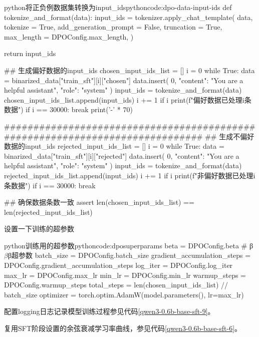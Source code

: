 \documentclass[lang=cn,newtx,10pt,scheme=chinese]{elegantbook}
\begin{document}
\begin{codebox}{python}{将正负例数据集转换为input\_ids}{pythoncode:dpo-data-input-ids}
def tokenize_and_format(data):
    input_ids = tokenizer.apply_chat_template(
        data,
        tokenize = True,
        add_generation_prompt = False,
        truncation = True,
        max_length = DPOConfig.max_length,
    )

    return input_ids

## 生成偏好数据的input_ids
chosen_input_ids_list = []
i = 0
while True:
    data = binarized_data["train_sft"][i]["chosen"]
    data.insert(
        0,
        {"content": "You are a helpful assistant", "role": "system"}
    )
    input_ids = tokenize_and_format(data)
    chosen_input_ids_list.append(input_ids)
    i += 1
    if i %
        print(f"偏好数据已处理{i}条数据")
    if i == 30000:
        break
print('-' * 70)

#############################################################################
## 生成不偏好数据的input_ids
rejected_input_ids_list = []
i = 0
while True:
    data = binarized_data["train_sft"][i]["rejected"]
    data.insert(
        0,
        {"content": "You are a helpful assistant", "role": "system"}
    )
    input_ids = tokenize_and_format(data)
    rejected_input_ids_list.append(input_ids)
    i += 1
    if i %
        print(f"非偏好数据已处理{i}条数据")
    if i == 30000:
        break

## 确保数据条数一致
assert len(chosen_input_ids_list) == len(rejected_input_ids_list)
\end{codebox}

设置一下训练的超参数

\begin{codebox}{python}{训练用的超参数}{pythoncode:dposuperparams}
beta = DPOConfig.beta # β$\beta$β超参数
batch_size = DPOConfig.batch_size
gradient_accumulation_steps = DPOConfig.gradient_accumulation_steps
log_iter = DPOConfig.log_iter
max_lr = DPOConfig.max_lr
min_lr = DPOConfig.min_lr
warmup_steps = DPOConfig.warmup_steps
total_steps = len(chosen_input_ids_list) // batch_size
optimizer = torch.optim.AdamW(model.parameters(), lr=max_lr)
\end{codebox}

配置logging日志记录模型训练过程参见代码\ref{qwen3-0.6b-base-sft-9}。

复用SFT阶段设置的余弦衰减学习率曲线，参见代码\ref{qwen3-0.6b-base-sft-6}。
\end{document}

